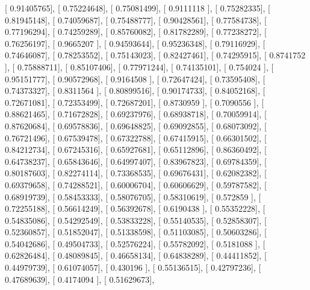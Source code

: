 \documentclass{article}
\begin{document}
       [ 0.91405765],
       [ 0.75224648],
       [ 0.75081499],
       [ 0.9111118 ],
       [ 0.75282335],
       [ 0.81945148],
       [ 0.74059687],
       [ 0.75488777],
       [ 0.90428561],
       [ 0.77584738],
       [ 0.77196294],
       [ 0.74259289],
       [ 0.85760082],
       [ 0.81782289],
       [ 0.77238272],
       [ 0.76256197],
       [ 0.9665207 ],
       [ 0.94593644],
       [ 0.95236348],
       [ 0.79116929],
       [ 0.74646087],
       [ 0.78253552],
       [ 0.75143023],
       [ 0.82427461],
       [ 0.74295915],
       [ 0.8741752 ],
       [ 0.75888711],
       [ 0.85107406],
       [ 0.77971244],
       [ 0.74135101],
       [ 0.754024  ],
       [ 0.95151777],
       [ 0.90572968],
       [ 0.9164508 ],
       [ 0.72647424],
       [ 0.73595408],
       [ 0.74373327],
       [ 0.8311564 ],
       [ 0.80899516],
       [ 0.90174733],
       [ 0.84052168],
       [ 0.72671081],
       [ 0.72353499],
       [ 0.72687201],
       [ 0.8730959 ],
       [ 0.7090556 ],
       [ 0.88621465],
       [ 0.71672828],
       [ 0.69237976],
       [ 0.68938718],
       [ 0.70059914],
       [ 0.87620684],
       [ 0.69578836],
       [ 0.69648825],
       [ 0.69092855],
       [ 0.68073092],
       [ 0.76721496],
       [ 0.67539478],
       [ 0.67322788],
       [ 0.67415915],
       [ 0.66301502],
       [ 0.84212734],
       [ 0.67245316],
       [ 0.65927681],
       [ 0.65112896],
       [ 0.86360492],
       [ 0.64738237],
       [ 0.65843646],
       [ 0.64997407],
       [ 0.83967823],
       [ 0.69784359],
       [ 0.80187603],
       [ 0.82274114],
       [ 0.73368535],
       [ 0.69676431],
       [ 0.62082382],
       [ 0.69379658],
       [ 0.74288521],
       [ 0.60006704],
       [ 0.60606629],
       [ 0.59787582],
       [ 0.68919739],
       [ 0.58453333],
       [ 0.58076705],
       [ 0.58310619],
       [ 0.572859  ],
       [ 0.72255188],
       [ 0.56614249],
       [ 0.56392678],
       [ 0.6190438 ],
       [ 0.55352228],
       [ 0.54835086],
       [ 0.54292549],
       [ 0.53833228],
       [ 0.55140535],
       [ 0.52858307],
       [ 0.52360857],
       [ 0.51852047],
       [ 0.51338598],
       [ 0.51103085],
       [ 0.50603286],
       [ 0.54042686],
       [ 0.49504733],
       [ 0.52576224],
       [ 0.55782092],
       [ 0.5181088 ],
       [ 0.62826484],
       [ 0.48089845],
       [ 0.46658134],
       [ 0.64838289],
       [ 0.44411852],
       [ 0.44979739],
       [ 0.61074057],
       [ 0.430196  ],
       [ 0.55136515],
       [ 0.42797236],
       [ 0.47689639],
       [ 0.4174094 ],
       [ 0.51629673],
\end{document}
